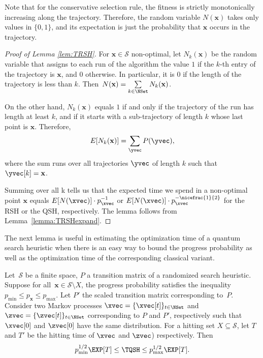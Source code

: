 Note that for the conservative selection rule, the fitness is strictly
monotonically increasing along the trajectory. Therefore, the random
variable $N(\mathbf{x})$ takes only values in $\{0,1\}$, and its
expectation is just the probability that $\mathbf{x}$ occurs in the
trajectory.

\begin{proof}[Proof of Lemma \ref{lem:TRSH}]

For $\mathbf{x}\in\mathcal{S}$ non-optimal, let $N_k(\mathbf{x})$ be
the random variable that assigns to each run of the algorithm the
value $1$ if the $k$-th entry of the trajectory is $\mathbf{x}$, and
$0$ otherwise. In particular, it is $0$ if the length of the
trajectory is less than $k$. Then~$N(\mathbf{x}) = \sum\limits_{k \in
  \NSet} N_k(\mathbf{x})$.

On the other hand, $N_k(\mathbf{x})$ equals $1$ if and only if the
trajectory of the run has length at least $k$, and if it starts with a
sub-trajectory of length $k$ whose last point is
$\mathbf{x}$. Therefore,
\[
E[N_k(\mathbf{x})] = \sum_{\yvec} P(\yvec),
\]
where the sum runs over all trajectories $\yvec$ of length $k$ such
that $\yvec[k] = \mathbf{x}$.

Summing over all k tells us that the expected time we spend in a
non-optimal point $\mathbf{x}$ equals $E[N(\xvec)] \cdot
p_{\xvec}^{-1}$ or $E[N(\xvec)] \cdot p_{\xvec}^{-\nicefrac{1}{2}}$
for the RSH or the QSH, respectively. The lemma follows from
Lemma~\ref{lemma:TRSHexpand}.
\end{proof}

The next lemma is useful in estimating the optimization time of a
quantum search heuristic when there is an easy way to bound the
progress probability as well as the optimization time of the
corresponding classical variant.


\begin{lemma}
\label{lem:boundedq}
Let~$\mathcal{S}$ be a finite space, $P$ a transition matrix of a
randomized search heuristic.  Suppose for
all~$\mathbf{x}\in\mathcal{S}\setminus X$, the progress probability
satisfies the inequality $p_{\min}\le p_{\mathbf{x}}\le p_{\max}$. Let
$P'$ the scaled transition matrix corresponding to~$P$. Consider two
Markov processes $\xvec = \{\xvec[t]\}_{t\in\NSet}$ and $\zvec =
\{\zvec[t]\}_{t\in\NSet}$ corresponding to $P$ and $P'$, respectively
such that $\xvec[0]$ and $\zvec[0]$ have the same distribution. For a
hitting set $X\subseteq\mathcal{S}$, let $T$ and $T'$ be the hitting
time of $\xvec$ and $\zvec$) respectively. Then
\[
p_{\min}^{1/2}\EXP[T]\le \TQSH \le p_{\max}^{1/2}\EXP[T].
\]
\end{lemma}

